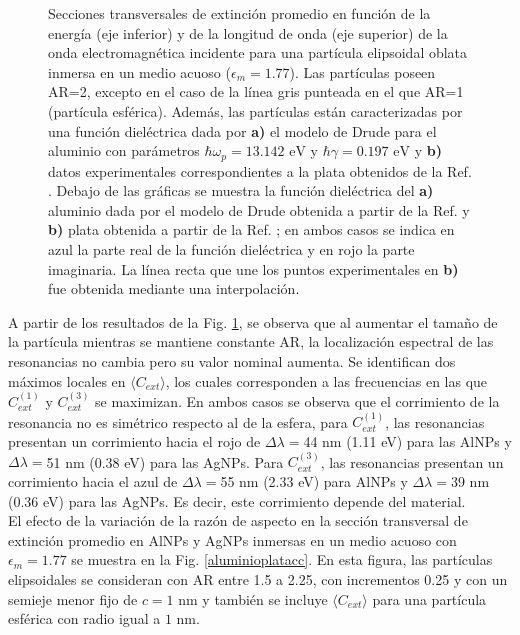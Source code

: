 \begin{figure}[h!]
	\quad%
	\caption{Secciones transversales de extinción promedio en función de la energía (eje inferior) y de la longitud de onda (eje superior) de la onda electromagnética incidente para una partícula elipsoidal oblata inmersa en un medio acuoso ($\epsilon_m=1.77$).  Las partículas poseen AR=2, excepto en el caso de la línea gris punteada en el que AR=1 (partícula esférica). Además, las partículas están caracterizadas por una función dieléctrica dada por  \textbf{a)} el modelo de Drude para el aluminio con parámetros $\hbar\omega_p=13.142\text{ eV}$ y $\hbar\gamma=0.197\text{ eV}$ \cite{Aluminio} y \textbf{b)} datos experimentales correspondientes a la plata obtenidos de la Ref. \cite{Plata}. Debajo de las gráficas se muestra la función dieléctrica del \textbf{a)} aluminio dada por el modelo de Drude obtenida a partir de la Ref. \cite{Aluminio} y \textbf{b)} plata obtenida a partir de la Ref. \cite{Plata}; en ambos casos se indica en azul la parte real de la función dieléctrica y en rojo la parte imaginaria. La línea recta que une los puntos experimentales en \textbf{b)}  fue obtenida mediante una interpolación.}\label{aluminioplataAR}
\end{figure}
A partir de los resultados de la Fig. \ref{aluminioplataAR}, se observa que al aumentar el tamaño de la partícula mientras se mantiene constante AR, la localización espectral de las resonancias no cambia pero su valor nominal aumenta. Se identifican dos máximos locales en $\langle C_{ext}\rangle$,  los cuales corresponden a las frecuencias en las que $C_{ext}^{(1)}$ y $C_{ext}^{(3)}$ se maximizan. En ambos casos se observa que el corrimiento  de la resonancia no es simétrico respecto al de la esfera, para $C_{ext}^{(1)}$, las resonancias presentan un corrimiento hacia el rojo de $\Delta\lambda=$44 nm (1.11 eV) para las AlNPs y $\Delta\lambda=$51 nm (0.38 eV) para las AgNPs. Para $C_{ext}^{(3)}$, las resonancias presentan un corrimiento hacia el azul de $\Delta\lambda=$55 nm (2.33 eV) para AlNPs y $\Delta\lambda=$39 nm (0.36 eV) para las AgNPs. Es decir, este corrimiento depende del material. \\

El efecto de la variación de la razón de aspecto en la sección transversal de extinción promedio en AlNPs y AgNPs inmersas en un medio acuoso con $\epsilon_m=1.77$ se muestra en la Fig. \ref{aluminioplatacc}. En esta figura, las partículas elipsoidales se consideran con AR entre 1.5 a 2.25, con incrementos 0.25 y con un semieje menor fijo de $c=1\text{ nm}$ y también se incluye $\langle C_{ext}\rangle$ para una partícula esférica con radio igual a $1\text{ nm}$.\\



